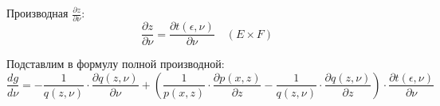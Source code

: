 \documentclass{article}
\begin{document}
Производная \(\frac{\partial z}{\partial \nu}\):
\[
\frac{\partial z}{\partial \nu} = \frac{\partial t(\epsilon, \nu)}{\partial \nu} \quad (E \times F)
\]

Подставлим в формулу полной производной:
\[
\frac{dg}{d\nu} = -\frac{1}{q(z, \nu)} \cdot \frac{\partial q(z, \nu)}{\partial \nu} + (\frac{1}{p(x, z)} \cdot \frac{\partial p(x, z)}{\partial z} - \frac{1}{q(z, \nu)} \cdot \frac{\partial q(z, \nu)}{\partial z}) \cdot \frac{\partial t(\epsilon, \nu)}{\partial \nu}
\]
\end{document}
